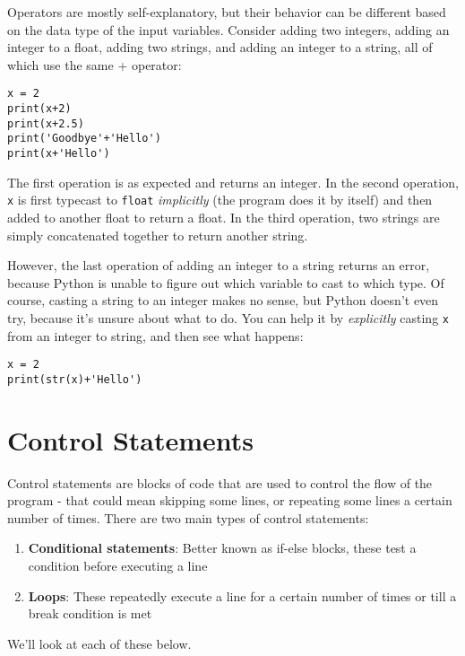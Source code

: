 \documentclass[12pt]{article}
\newcommand{\code}{\texttt}
\begin{document}
Operators are mostly self-explanatory, but their behavior can be different based on the data type of the input variables. Consider adding two integers, adding an integer to a float, adding two strings, and adding an integer to a string, all of which use the same + operator:

\begin{lstlisting}[frame=single] 
x = 2
print(x+2)
print(x+2.5)
print('Goodbye'+'Hello')
print(x+'Hello')
\end{lstlisting}

The first operation is as expected and returns an integer. In the second operation, \code{x} is first typecast to \code{float} \textit{implicitly} (the program does it by itself) and then added to another float to return a float. In the third operation, two strings are simply concatenated together to return another string. 

However, the last operation of adding an integer to a string returns an error, because Python is unable to figure out which variable to cast to which type. Of course, casting a string to an integer makes no sense, but Python doesn't even try, because it's unsure about what to do. You can help it by \textit{explicitly} casting \code{x} from an integer to string, and then see what happens:

\begin{lstlisting}[frame=single] 
x = 2
print(str(x)+'Hello')
\end{lstlisting}

\newpage

\section{Control Statements}
Control statements are blocks of code that are used to control the flow of the program - that could mean skipping some lines, or repeating some lines a certain number of times. There are two main types of control statements:

\begin{enumerate}
	\item \textbf{Conditional statements}: Better known as if-else blocks, these test a condition before executing a line
	\item \textbf{Loops}: These repeatedly execute a line for a certain number of times or till a break condition is met 
\end{enumerate}

We'll look at each of these below.
\end{document}
